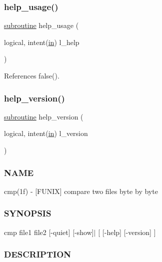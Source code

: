 \subsubsection{\texorpdfstring{help\+\_\+usage()}{help\_usage()}}
{\footnotesize\ttfamily \hyperlink{M__stopwatch_83_8txt_acfbcff50169d691ff02d4a123ed70482}{subroutine} help\+\_\+usage (\begin{DoxyParamCaption}\item[{logical, intent(\hyperlink{M__journal_83_8txt_afce72651d1eed785a2132bee863b2f38}{in})}]{l\+\_\+help }\end{DoxyParamCaption})}



References false().

\mbox{\label{__cmp_8f90_a39c21619b08a3c22f19e2306efd7f766}} 
\subsubsection{\texorpdfstring{help\+\_\+version()}{help\_version()}}
{\footnotesize\ttfamily \hyperlink{M__stopwatch_83_8txt_acfbcff50169d691ff02d4a123ed70482}{subroutine} help\+\_\+version (\begin{DoxyParamCaption}\item[{logical, intent(\hyperlink{M__journal_83_8txt_afce72651d1eed785a2132bee863b2f38}{in})}]{l\+\_\+version }\end{DoxyParamCaption})}



\subsubsection*{N\+A\+ME}

cmp(1f) -\/ \mbox{[}F\+U\+N\+IX\mbox{]} compare two files byte by byte \subsubsection*{S\+Y\+N\+O\+P\+S\+IS}

cmp file1 file2 \mbox{[}-\/quiet\mbox{]} \mbox{[}-\/show\mbox{]}$\vert$ \mbox{[} \mbox{[}-\/help\mbox{]} \mbox{[}-\/version\mbox{]} \mbox{]} \subsubsection*{D\+E\+S\+C\+R\+I\+P\+T\+I\+ON}

